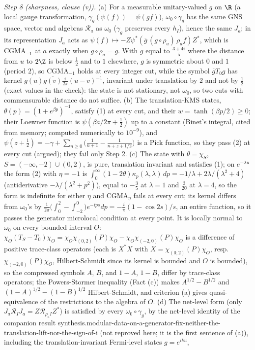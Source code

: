 \emph{Step 8 (sharpness, clause (v)).} (a) For a measurable unitary-valued $g$ on $\R$ (a local gauge transformation, $\gamma_{g}(\psi(f)) = \psi(gf)$), $\omega_{0}\circ\gamma_{g}$ has the same GNS space, vector and algebras $\mathcal{R}_{a}$ as $\omega_{0}$ ($\gamma_{g}$ preserves every $h_{I}$), hence the same $J_{a}$; in its representation $J_{a}$ acts as $\psi(f) \mapsto -Z\psi^{*}(\overline{g}\,(g\circ\rho_{a})\,\rho_{a}f)Z^{*}$, which is CGMA$_{-1}$ at $a$ exactly when $g\circ\rho_{a} = g$. With $g$ equal to $\tfrac{3 + 4i}{5}$ where the distance from $u$ to $2\Z$ is below $\tfrac12$ and to $1$ elsewhere, $g$ is symmetric about $0$ and $1$ (period $2$), so CGMA$_{-1}$ holds at every integer cut, while the symbol $\overline{g}T_{0}g$ has kernel $g(u)\overline{g(v)}\tfrac{i}{2\pi}(u - v)^{-1}$, invariant under translation by $2$ and not by $\tfrac12$ (exact values in the check): the state is not stationary, not $\omega_{0}$, so two cuts with commensurable distance do not suffice. (b) The translation-KMS states, $\theta(p) = (1 + e^{\beta p})^{-1}$, satisfy (1) at every cut, and their $w = \tanh(\beta p/2) \ge 0$; their Loewner function is $\psi(\beta a/2\pi + \tfrac12)$ up to a constant (Binet's integral, cited from memory; computed numerically to $10^{-9}$), and $\psi(z + \tfrac12) = -\gamma + \sum_{n \ge 0}\big(\tfrac{1}{n + 1} - \tfrac{1}{n + z + 1/2}\big)$ is a Pick function, so they pass (2) at every cut (argued); they fail only Step 2. (c) The state with $\theta = \chi_{S}$, $S = (-\infty, -2)\cup(0, 2)$, is pure, translation invariant and satisfies (1); on $e^{-\lambda u}$ the form (2) with $\eta = -1$ is $\int_{0}^{\infty}(1 - 2\theta)\kappa_{p}(\lambda, \lambda)\,dp = -1/\lambda + 2\lambda/(\lambda^{2} + 4)$ (antiderivative $-\lambda/(\lambda^{2} + p^{2})$), equal to $-\tfrac35$ at $\lambda = 1$ and $\tfrac{3}{20}$ at $\lambda = 4$, so the form is indefinite for either $\eta$ and CGMA$_{\eta}$ fails at every cut; its kernel differs from $\omega_{0}$'s by $\tfrac{1}{2\pi}\big(\int_{0}^{2} - \int_{-2}^{0}\big)e^{-ips}dp = -\tfrac{i}{\pi}(1 - \cos 2s)/s$, an entire function, so it passes the generator microlocal condition at every point. It is locally normal to $\omega_{0}$ on every bounded interval $O$: $\chi_{O}(T_{S} - T_{0})\chi_{O} = \chi_{O}\chi_{(0, 2)}(P)\chi_{O} - \chi_{O}\chi_{(-2, 0)}(P)\chi_{O}$ is a difference of positive trace-class operators (each is $X^{*}X$ with $X = \chi_{(0, 2)}(P)\chi_{O}$, resp. $\chi_{(-2, 0)}(P)\chi_{O}$, Hilbert-Schmidt since its kernel is bounded and $O$ is bounded), so the compressed symbols $A$, $B$, and $1 - A$, $1 - B$, differ by trace-class operators; the Powers-Stormer inequality (Fact (c)) makes $A^{1/2} - B^{1/2}$ and $(1 - A)^{1/2} - (1 - B)^{1/2}$ Hilbert-Schmidt, and criterion (a) gives quasi-equivalence of the restrictions to the algebra of $O$. (d) The net-level form (only $J_{a}\mathcal{R}_{I}J_{a} = Z\mathcal{R}_{\rho_{a}I}Z^{*}$) is satisfied by every $\omega_{0}\circ\gamma_{g}$, by the net-level identity of the companion result synthesis.modular-data-on-a-generator-fix-neither-the-translation-lift-nor-the-sign-of-i (not reproved here; it is the first sentence of (a)), including the translation-invariant Fermi-level states $g = e^{iku}$, 